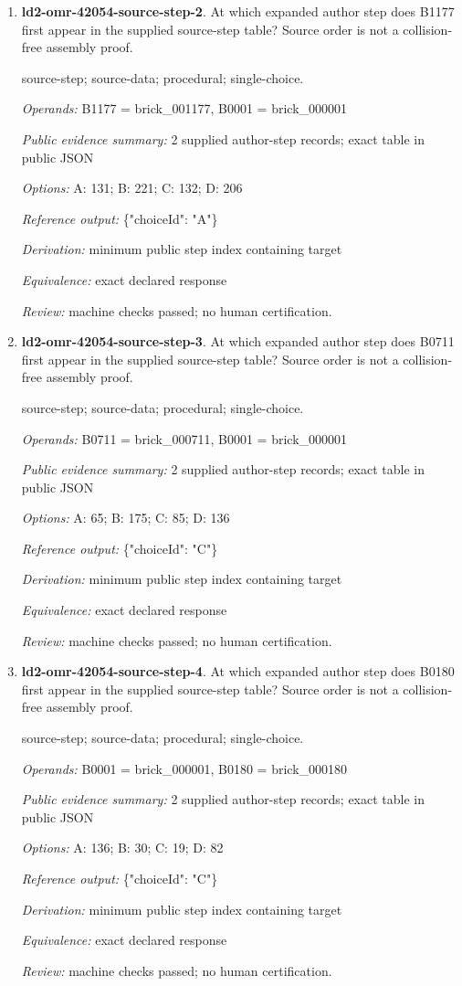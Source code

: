 \begin{enumerate}
\item \textbf{ld2-omr-42054-source-step-2}. At which expanded author step does B1177 first appear in the supplied source-step table? Source order is not a collision-free assembly proof.
\par{\small source-step; source-data; procedural; single-choice.\par\textit{Operands:} B1177 = brick\_001177, B0001 = brick\_000001\par\textit{Public evidence summary:} 2 supplied author-step records; exact table in public JSON\par\textit{Options:} A: 131; B: 221; C: 132; D: 206\par\textit{Reference output:} \{"choiceId": "A"\}\par\textit{Derivation:} minimum public step index containing target\par\textit{Equivalence:} exact declared response\par\textit{Review:} machine checks passed; no human certification.}
\item \textbf{ld2-omr-42054-source-step-3}. At which expanded author step does B0711 first appear in the supplied source-step table? Source order is not a collision-free assembly proof.
\par{\small source-step; source-data; procedural; single-choice.\par\textit{Operands:} B0711 = brick\_000711, B0001 = brick\_000001\par\textit{Public evidence summary:} 2 supplied author-step records; exact table in public JSON\par\textit{Options:} A: 65; B: 175; C: 85; D: 136\par\textit{Reference output:} \{"choiceId": "C"\}\par\textit{Derivation:} minimum public step index containing target\par\textit{Equivalence:} exact declared response\par\textit{Review:} machine checks passed; no human certification.}
\item \textbf{ld2-omr-42054-source-step-4}. At which expanded author step does B0180 first appear in the supplied source-step table? Source order is not a collision-free assembly proof.
\par{\small source-step; source-data; procedural; single-choice.\par\textit{Operands:} B0001 = brick\_000001, B0180 = brick\_000180\par\textit{Public evidence summary:} 2 supplied author-step records; exact table in public JSON\par\textit{Options:} A: 136; B: 30; C: 19; D: 82\par\textit{Reference output:} \{"choiceId": "C"\}\par\textit{Derivation:} minimum public step index containing target\par\textit{Equivalence:} exact declared response\par\textit{Review:} machine checks passed; no human certification.}

\end{enumerate}
